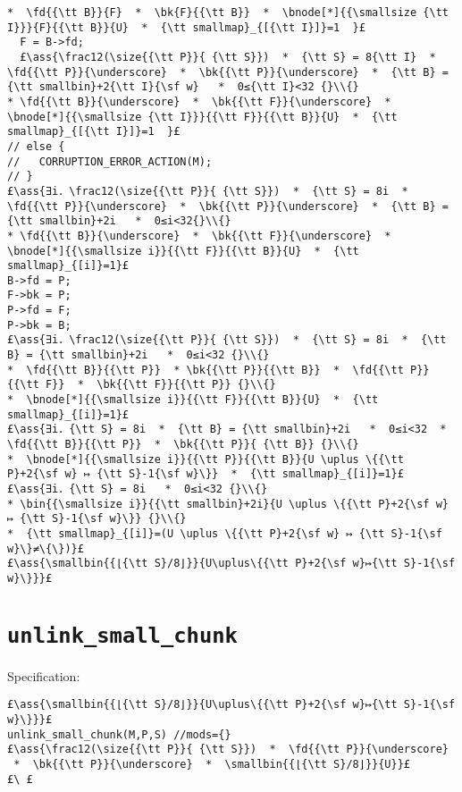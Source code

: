 \documentclass[10pt,twoside]{report}
\makeatletter
\newcommand{\ml}[2][t]{\mbox{\mdseries\begin{tabular}[#1]{@{}L@{}}#2\end{tabular}}}
\newcommand{\ass}[1]{\ensuremath{{\color{blue}\left\{\ml[c]{#1}\right\}}}}
\makeatother
\begin{document}
\begin{lstlisting}
*  \fd{{\tt B}}{F}  *  \bk{F}{{\tt B}}  *  \bnode[*]{{\smallsize {\tt I}}}{F}{{\tt B}}{U}  *  {\tt smallmap}_{[{\tt I}]}=1  }£
  F = B->fd;
  £\ass{\frac12(\size{{\tt P}}{ {\tt S}})  *  {\tt S} = 8{\tt I}  *  \fd{{\tt P}}{\underscore}  *  \bk{{\tt P}}{\underscore}  *  {\tt B} = {\tt smallbin}+2{\tt I}{\sf w}   *  0≤{\tt I}<32 {}\\{}
* \fd{{\tt B}}{\underscore}  *  \bk{{\tt F}}{\underscore}  *  \bnode[*]{{\smallsize {\tt I}}}{{\tt F}}{{\tt B}}{U}  *  {\tt smallmap}_{[{\tt I}]}=1  }£
// else {
//   CORRUPTION_ERROR_ACTION(M);
// }
£\ass{∃i．\frac12(\size{{\tt P}}{ {\tt S}})  *  {\tt S} = 8i  *  \fd{{\tt P}}{\underscore}  *  \bk{{\tt P}}{\underscore}  *  {\tt B} = {\tt smallbin}+2i   *  0≤i<32{}\\{}
* \fd{{\tt B}}{\underscore}  *  \bk{{\tt F}}{\underscore}  *  \bnode[*]{{\smallsize i}}{{\tt F}}{{\tt B}}{U}  *  {\tt smallmap}_{[i]}=1}£
B->fd = P;
F->bk = P;
P->fd = F;
P->bk = B;
£\ass{∃i．\frac12(\size{{\tt P}}{ {\tt S}})  *  {\tt S} = 8i  *  {\tt B} = {\tt smallbin}+2i   *  0≤i<32 {}\\{}
*  \fd{{\tt B}}{{\tt P}}  * \bk{{\tt P}}{{\tt B}}  *  \fd{{\tt P}}{{\tt F}}  *  \bk{{\tt F}}{{\tt P}} {}\\{}
*  \bnode[*]{{\smallsize i}}{{\tt F}}{{\tt B}}{U}  *  {\tt smallmap}_{[i]}=1}£
£\ass{∃i．{\tt S} = 8i  *  {\tt B} = {\tt smallbin}+2i   *  0≤i<32  *  \fd{{\tt B}}{{\tt P}}  *  \bk{{\tt P}}{ {\tt B}} {}\\{}
*  \bnode[*]{{\smallsize i}}{{\tt P}}{{\tt B}}{U \uplus \{{\tt P}+2{\sf w} ↦ {\tt S}-1{\sf w}\}}  *  {\tt smallmap}_{[i]}=1}£
£\ass{∃i．{\tt S} = 8i   *  0≤i<32 {}\\{}
* \bin{{\smallsize i}}{{\tt smallbin}+2i}{U \uplus \{{\tt P}+2{\sf w} ↦ {\tt S}-1{\sf w}\}} {}\\{}
*  {\tt smallmap}_{[i]}=(U \uplus \{{\tt P}+2{\sf w} ↦ {\tt S}-1{\sf w}\}≠\{\})}£
£\ass{\smallbin{{⌊{\tt S}/8⌋}}{U\uplus\{{\tt P}+2{\sf w}↦{\tt S}-1{\sf w}\}}}£
\end{lstlisting}


\section{{\tt unlink\_small\_chunk}} 

Specification:  
\begin{lstlisting}   
£\ass{\smallbin{{⌊{\tt S}/8⌋}}{U\uplus\{{\tt P}+2{\sf w}↦{\tt S}-1{\sf w}\}}}£
unlink_small_chunk(M,P,S) //mods={}
£\ass{\frac12(\size{{\tt P}}{ {\tt S}})  *  \fd{{\tt P}}{\underscore}  *  \bk{{\tt P}}{\underscore}  *  \smallbin{{⌊{\tt S}/8⌋}}{U}}£
£\ £
\end{lstlisting}  
  
\end{document}
